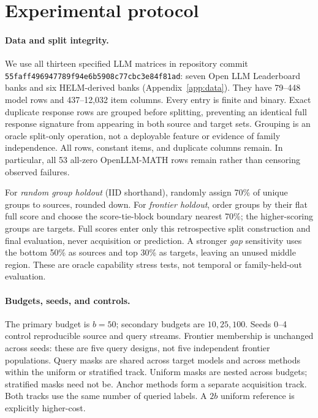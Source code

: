 \documentclass{article}
\begin{document}
\section{Experimental protocol}\label{sec:protocol}
\paragraph{Data and split integrity.}
We use all thirteen specified LLM matrices in repository commit \texttt{55faff496947789f94e6b5908c77cbc3e84f81ad}: seven Open LLM Leaderboard banks and six HELM-derived banks (Appendix~\ref{app:data}). They have 79--448 model rows and 437--12,032 item columns. Every entry is finite and binary. Exact duplicate response rows are grouped before splitting, preventing an identical full response signature from appearing in both source and target sets. Grouping is an oracle split-only operation, not a deployable feature or evidence of family independence. All rows, constant items, and duplicate columns remain. In particular, all 53 all-zero OpenLLM-MATH rows remain rather than censoring observed failures.

For \emph{random group holdout} (IID shorthand), randomly assign 70\% of unique groups to sources, rounded down. For \emph{frontier holdout}, order groups by their flat full score and choose the score-tie-block boundary nearest 70\%; the higher-scoring groups are targets. Full scores enter only this retrospective split construction and final evaluation, never acquisition or prediction. A stronger \emph{gap} sensitivity uses the bottom 50\% as sources and top 30\% as targets, leaving an unused middle region. These are oracle capability stress tests, not temporal or family-held-out evaluation.

\paragraph{Budgets, seeds, and controls.}
The primary budget is $b=50$; secondary budgets are $10,25,100$. Seeds 0--4 control reproducible source and query streams. Frontier membership is unchanged across seeds: these are five query designs, not five independent frontier populations. Query masks are shared across target models and across methods within the uniform or stratified track. Uniform masks are nested across budgets; stratified masks need not be. Anchor methods form a separate acquisition track. Both tracks use the same number of queried labels. A $2b$ uniform reference is explicitly higher-cost.
\end{document}
